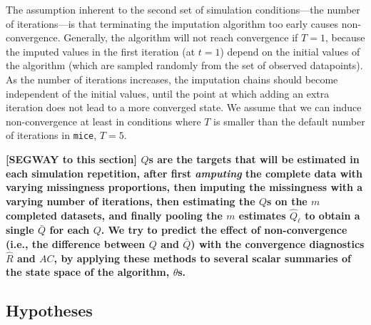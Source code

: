 \documentclass[Royal,times,sageh]{sagej}
\begin{document}
The assumption inherent to the second set of simulation conditions---the number of iterations---is that terminating the imputation algorithm too early causes non-convergence. Generally, the algorithm will not reach convergence if \(T=1\), because the imputed values in the first iteration (at \(t=1\)) depend on the initial values of the algorithm (which are sampled randomly from the set of observed datapoints). As the number of iterations increases, the imputation chains should become independent of the initial values, until the point at which adding an extra iteration does not lead to a more converged state. We assume that we can induce non-convergence at least in conditions where \(T\) is smaller than the default number of iterations in \texttt{mice}, \(T=5\).

\textbf{{[}SEGWAY to this section{]} \(Q\)s are the targets that will be estimated in each simulation repetition, after first \emph{amputing} the complete data with varying missingness proportions, then imputing the missingness with a varying number of iterations, then estimating the \(Q\)s on the \(m\) completed datasets, and finally pooling the \(m\) estimates \(\hat{Q}_\ell\) to obtain a single \(\bar{Q}\) for each \(Q\). We try to predict the effect of non-convergence (i.e., the difference between \(Q\) and \(\bar{Q}\)) with the convergence diagnostics \(\widehat{R}\) and \(AC\), by applying these methods to several scalar summaries of the state space of the algorithm, \(\theta\)s.}

\hypertarget{hypotheses}{%
\subsection{Hypotheses}\label{hypotheses}}
\end{document}
